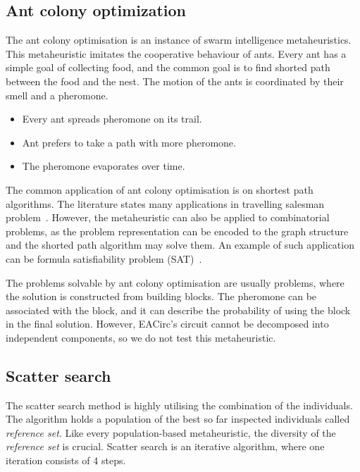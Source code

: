 \documentclass[
  print, %
  Table,   %
  nolof,     %
  nolot,     %
  11pt, %
  oneside  %
]{fithesis3}
\begin{document}
\subsection{Ant colony optimization}
\label{subsec:opt-popul-aco}

The ant colony optimisation is an instance of swarm intelligence metaheuristics. This metaheuristic imitates the cooperative behaviour of ants. Every ant has a simple goal of collecting food, and the common goal is to find shorted path between the food and the nest. The motion of the ants is coordinated by their smell and a pheromone.

\begin{itemize}
    \item Every ant spreads pheromone on its trail.
    \item Ant prefers to take a path with more pheromone.
    \item The pheromone evaporates over time.
\end{itemize}

The common application of ant colony optimisation is on shortest path algorithms. The literature states many applications in travelling salesman problem~\cite{dorigo1997ant}. However, the metaheuristic can also be applied to combinatorial problems, as the problem representation can be encoded to the graph structure and the shorted path algorithm may solve them. An example of such application can be formula satisfiability problem (SAT)~\cite{moritz2010solving}.

The problems solvable by ant colony optimisation are usually problems, where the solution is constructed from building blocks. The pheromone can be associated with the block, and it can describe the probability of using the block in the final solution. However, EACirc's circuit cannot be decomposed into independent components, so we do not test this metaheuristic.

\subsection{Scatter search}
\label{subsec:opt-popul-scatter}

The scatter search method is highly utilising the combination of the individuals. The algorithm holds a population of the best so far inspected individuals called \textit{reference set}. Like every population-based metaheuristic, the diversity of the \textit{reference set} is crucial. Scatter search is an iterative algorithm, where one iteration consists of 4 steps.
\end{document}
